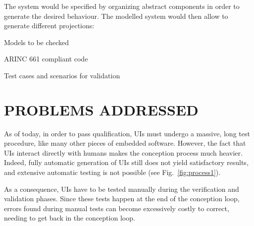 \documentclass{sigchi}
\newenvironment{packed_itemize}{
\begin{itemize}
  \setlength{\itemsep}{1pt}
  \setlength{\parskip}{0pt}
}{\end{itemize}}
\begin{document}
The system would be specified by organizing abstract components in order to generate the desired behaviour.
The modelled system would then allow to generate different projections:
\begin{packed_itemize}
\item{Models to be checked}
\item{ARINC 661 compliant code}
\item{Test cases and scenarios for validation}
\end{packed_itemize}

\section{PROBLEMS ADDRESSED}%

  As of today, in order to pass qualification, UIs must undergo a massive, long test procedure, like many other pieces of embedded software. However, the fact that UIs interact directly with humans makes the conception process much heavier. Indeed, fully automatic generation of UIs still does not yield satisfactory results, and extensive automatic testing is not possible (see Fig.~\ref{fig:process1}).

  As a consequence, UIs have to be tested manually during the verification and validation phases. Since these tests happen at the end of the conception loop, errors found during manual tests can become excessively costly to correct, needing to get back in the conception loop.
\end{document}
